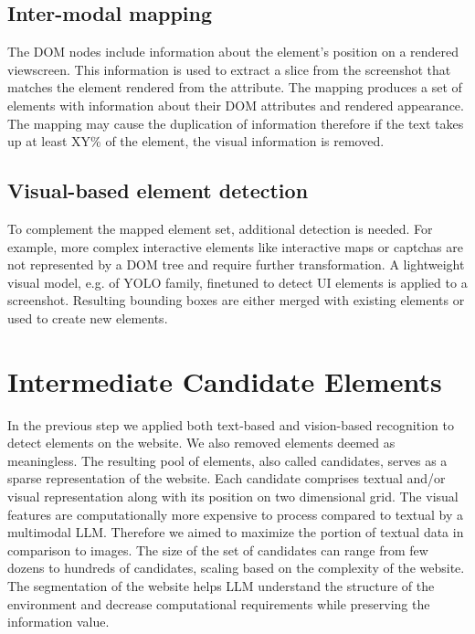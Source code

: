 \subsection{Inter-modal mapping}\label{subsection:mapping}
The DOM nodes include information about the element's position on a rendered viewscreen. This information is used to extract a slice from the screenshot that matches the element rendered from the attribute. The mapping produces a set of elements with information about their DOM attributes and rendered appearance. The mapping may cause the duplication of information therefore if the text takes up at least XY\% of the element, the visual information is removed.

\subsection{Visual-based element detection}\label{subsection:detection}
To complement the mapped element set, additional detection is needed. For example, more complex interactive elements like interactive maps or captchas are not represented by a DOM tree and require further transformation. A lightweight visual model, e.g. of YOLO family, finetuned to detect UI elements is applied to a screenshot. Resulting bounding boxes are either merged with existing elements or used to create new elements.

\section{Intermediate Candidate Elements}\label{section:candidates}
In the previous step we applied both text-based and vision-based recognition to detect elements on the website. We also removed elements deemed as meaningless. The resulting pool of elements, also called candidates, serves as a sparse representation of the website. Each candidate comprises textual and/or visual representation along with its position on two dimensional grid. The visual features are computationally more expensive to process compared to textual by a multimodal LLM. Therefore we aimed to maximize the portion of textual data in comparison to images. 
The size of the set of candidates can range from few dozens to hundreds of candidates, scaling based on the complexity of the website. The segmentation of the website helps LLM understand the structure of the environment and decrease computational requirements while preserving the information value.

